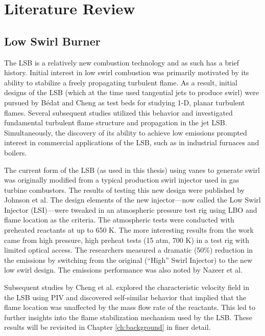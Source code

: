 \section{Literature Review}

\subsection{Low Swirl Burner}
\label{subsec:literature-review-lsb}

The LSB is a relatively new combustion technology and as such has a brief history.
Initial interest in low swirl combustion was primarily motivated by its ability to stabilize a freely propagating turbulent flame.\cite{1992-chan}
As a result, initial designs of the LSB (which at the time used tangential jets to produce swirl) were pursued by B{\'edat} and Cheng\cite{1995-bedat,1995-cheng} as test beds for studying 1-D, planar turbulent flames.
Several subsequent studies\cite{2000-plessing,2001-shepherd,2002-cheng,2002-shepherd,2004-kortschik,2005-degoey,2007-bell} utilized this behavior and investigated fundamental turbulent flame structure and propagation in the jet LSB.
Simultaneously, the discovery of its ability to achieve low  emissions prompted interest in commercial applications of the LSB, such as in industrial furnaces and boilers.\cite{1998-yegian,2000-cheng,2002-littlejohn}

The current form of the LSB (as used in this thesis) using vanes to generate swirl was originally modified from a typical production swirl injector used in gas turbine combustors.
The results of testing this new design were published by Johnson et al.\cite{2005-johnson}
The design elements of the new injector---now called the Low Swirl Injector (LSI)---were tweaked in an atmospheric pressure test rig using LBO and flame location as the criteria.
The atmospheric tests were conducted with preheated reactants at up to 650 K.
The more interesting results from the work came from high pressure, high preheat tests (15 atm, 700 K) in a test rig with limited optical access.
The researchers measured a dramatic (50\%) reduction in the  emissions by switching from the original (``High'' Swirl Injector) to the new low swirl design.
The emissions performance was also noted by Nazeer et al.\cite{2006-nazeer}

Subsequent studies by Cheng et al.\cite{2006-cheng,2008-cheng-a} explored the characteristic velocity field in the LSB using PIV and discovered self-similar behavior that implied that the flame location was unaffected by the mass flow rate of the reactants.
This led to further insights into the flame stabilization mechanism used by the LSB.
These results will be revisited in Chapter \ref{ch:background} in finer detail.

